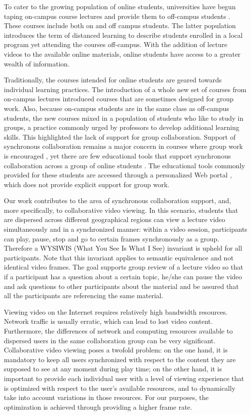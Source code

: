 \documentclass{sig-alternate}
\begin{document}
To cater to the growing population of online students, universities
have begun taping on-campus course lectures and provide them to
off-campus students \cite{CVN,SCPD}.  These courses include both
on and off campus students.  The latter population introduces the term
of distanced learning to describe students enrolled in a local program
yet attending the courses off-campus.  With the addition of lecture
videos to the available online materials, online students have access
to a greater wealth of information.

Traditionally, the courses intended for online students are geared
towards individual learning practices.  The introduction of a whole
new set of courses from on-campus lectures introduced courses that are
sometimes designed for group work.  Also, because on-campus students
are in the same class as off-campus students, the new courses mixed in
a population of students who like to study in groups, a practice
commonly urged by professors to develop additional learning skills.
This highlighted the lack of support for group collaboration.  Support
of synchronous collaboration remains a major concern in courses where
group work is encouraged \cite{WELLS}, yet there are few educational
tools that support synchronous collaboration across a group of online
students \cite{BURGESS}.  The educational tools commonly provided for
these students are accessed through a personalized Web portal
\cite{PHOENIX,CAPELLA}, which does not provide explicit support for
group work.

Our work contributes to the area of synchronous collaboration support,
and, more specifically, to collaborative video viewing.  In this
scenario, students that are dispersed across different geographical
regions can view a lecture video simultaneously and in a synchronized
manner: within a video session, participants can play, pause, stop and
go to certain frames synchronously as a group.  Therefore a WYSIWIS
(What You See Is What I See) invariant is upheld for all participants.
Note that this invariant applies to semantic equivalence and not
identical video frames.  The goal supports group review of a lecture
video so that if a participant has a question about a certain topic,
he/she can pause the video and ask questions to other participants
about the material and be assured that all the participants are
referencing the same material.

Viewing video on the Internet requires relatively high bandwidth
resources.  Network traffic is usually erratic, which can lead to lost
video content.  Furthermore, the differences of network and computing
resources available to dispersed users in the same collaboration group
can be very significant.  Collaborative video viewing poses a twofold
problem: on the one hand, it is mandatory to keep all users
synchronized with respect to the content they are supposed to see at
any moment during play time; on the other hand, it is important to
provide each individual user with a level of viewing experience that
is optimized with respect to the user's available resources, and to
dynamically take into account variations in those resources.  For our
purposes, the optimization is achieved through providing a higher
frame rate.
\end{document}
